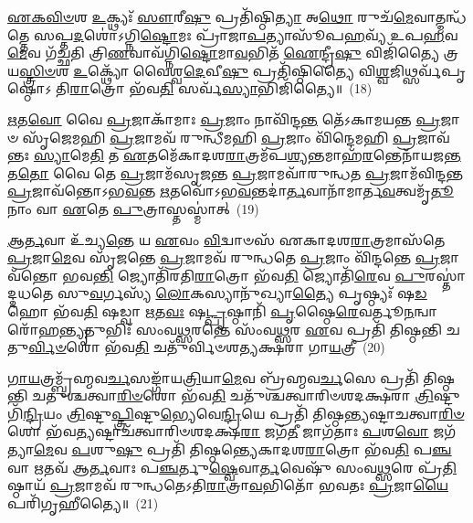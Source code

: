 \-\ul{𑌏}\-\-\ul{𑌕}\-\-\ul{𑌵𑌿}\-\-\ul{𑍞}\-𑌶 \ul{𑌉}\-𑌕𑍍𑌥𑍍𑌯𑌃᳴ \ul{𑌸𑍗}\-𑌰𑍀\-\ul{𑌷𑍁} 𑌪𑍍𑌰𑌤𑌿᳴𑌷𑍍𑌠𑌿\-\ul{𑌤𑍍𑌯𑌾} 𑌅\-\ul{𑌥𑍋} 𑌰𑍁𑌚᳴\-\ul{𑌮𑍇}\-𑌵𑌾𑌤𑍍𑌮𑌨𑍍𑌧᳴𑌤𑍍𑌤𑍇 𑌸𑌪𑍍𑌤\-\ul{𑌦}\-𑌶𑍋॑\-𑌽𑌗𑍍𑌨𑌿\-\ul{𑌷𑍍𑌟𑍋}\-𑌮𑌃 𑌪𑍍𑌰𑌾᳴𑌜𑌾\-\ul{𑌪}\-𑌤𑍍𑌯𑌾𑌸𑍂᳴𑌪\-\ul{𑌹}\-𑌵𑍍𑌯᳴ 𑌉𑌪\-\ul{𑌹}\-𑌵\-\ul{𑌮𑍇}\-𑌵 𑌗᳴𑌚𑍍𑌛𑌤𑌿 𑌤𑍍𑌰𑌿\-\ul{𑌣}\-𑌵𑌾𑌵᳴𑌗𑍍𑌨𑌿\-\ul{𑌷𑍍𑌟𑍋}\-𑌮𑌾\-\ul{𑌵}\-𑌭𑌿𑌤᳴ \ul{𑌐}\-𑌨𑍍𑌦𑍍𑌰𑍀\-\ul{𑌷𑍁} 𑌵𑌿𑌜𑌿᳴𑌤𑍍𑌯𑍈 𑌤𑍍𑌰𑌯\-\ul{𑌸𑍍𑌤𑍍𑌰𑌿}\-\-\ul{𑍞}\-𑌶 \ul{𑌉}\-𑌕𑍍𑌥𑍍𑌯𑍋᳴ 𑌵𑍈𑌶𑍍𑌵\-\ul{𑌦𑍇}\-𑌵𑍀\-\ul{𑌷𑍁} 𑌪𑍍𑌰𑌤𑌿᳴𑌷𑍍𑌠𑌿𑌤𑍍𑌯𑍈 𑌵𑌿\-\ul{𑌶𑍍𑌵}\-𑌜𑌿𑌥𑍍𑌸𑌰𑍍𑌵᳴𑌪𑍃𑌷𑍍𑌠𑍋\-𑌽 𑌤𑌿\-\ul{𑌰𑌾}\-𑌤𑍍𑌰𑍋 𑌭᳴𑌵\-\ul{𑌤𑌿} 𑌸𑌰𑍍𑌵᳴\-\ul{𑌸𑍍𑌯𑌾}\-𑌭𑌿𑌜𑌿᳴𑌤𑍍𑌯𑍈॥~(18)

{\anuvakamend[{\-\ul{𑌪𑍍𑌰𑌾}\-\-\ul{𑌜𑌾}\-\-\ul{𑌪}\-𑌤𑍍𑌯𑍋 𑌵𑌾 \ul{𑌏}\-𑌷 \ul{𑌯}\-𑌜𑍍𑌞𑍋 𑌯𑌦𑍍𑌦᳴𑌶\-\ul{𑌰𑌾}\-𑌤𑍍𑌰𑌸𑍍𑌤𑍍𑌰𑌿᳴\-\ul{𑌕}\-𑌕𑍁𑌦𑍍𑌵𑌾 \ul{𑌏}\-𑌤𑌾 𑌵𑍈 𑌜𑌾᳴𑌯\-\ul{𑌤} 𑌏𑌕᳴𑌤𑍍𑌰𑌿𑍞𑌶𑌚𑍍𑌚}]}%

\-\ul{𑌋}\-𑌤\-\ul{𑌵𑍋} 𑌵𑍈 \ul{𑌪𑍍𑌰}\-𑌜𑌾𑌕𑌾᳴𑌮𑌾𑌃 \ul{𑌪𑍍𑌰}\-𑌜𑌾𑌂 𑌨𑌾𑌵𑌿᳴𑌨𑍍𑌦\-\ul{𑌨𑍍𑌤} 𑌤𑍇᳴\-𑌽𑌕𑌾𑌮𑌯𑌨𑍍𑌤 \ul{𑌪𑍍𑌰}\-𑌜𑌾𑍞 𑌸𑍃᳴𑌜𑍇𑌮𑌹𑌿 \ul{𑌪𑍍𑌰}\-𑌜𑌾𑌮𑌵᳴ 𑌰𑍁𑌨𑍍𑌧𑍀𑌮𑌹𑌿 \ul{𑌪𑍍𑌰}\-𑌜𑌾𑌂 𑌵𑌿᳴𑌨𑍍𑌦𑍇𑌮𑌹𑌿 \ul{𑌪𑍍𑌰}\-𑌜𑌾𑌵᳴𑌨𑍍𑌤𑌃 \ul{𑌸𑍍𑌯𑌾}\-𑌮𑍇\-\ul{𑌤𑌿} 𑌤 \ul{𑌏}\-𑌤𑌮𑍇᳴𑌕𑌾𑌦𑌶\-\ul{𑌰𑌾}\-𑌤𑍍𑌰𑌮᳴𑌪\-\ul{𑌶𑍍𑌯}\-𑌨𑍍𑌤𑌮𑌾𑌹᳴\-\ul{𑌰}\-𑌨𑍍𑌤𑍇𑌨𑌾᳴𑌯𑌜\-\ul{𑌨𑍍𑌤} 𑌤\-\ul{𑌤𑍋} 𑌵𑍈 𑌤𑍇 \ul{𑌪𑍍𑌰}\-𑌜𑌾𑌮᳴𑌸𑍃𑌜𑌨𑍍𑌤 \ul{𑌪𑍍𑌰}\-𑌜𑌾𑌮𑌵𑌾᳴𑌰𑍁𑌨𑍍𑌧𑌤 \ul{𑌪𑍍𑌰}\-𑌜𑌾𑌮᳴𑌵𑌿𑌨𑍍𑌦𑌨𑍍𑌤 \ul{𑌪𑍍𑌰}\-𑌜𑌾𑌵᳴𑌨𑍍𑌤𑍋\-𑌽𑌭\-\ul{𑌵}\-𑌨𑍍𑌤 \ul{𑌋}\-𑌤𑌵𑍋᳴\-𑌽𑌭\-\ul{𑌵}\-𑌨𑍍𑌤𑌦𑌾॑\-\ul{𑌰𑍍𑌤}\-𑌵𑌾𑌨𑌾᳴𑌮𑌾𑌰𑍍𑌤\-\ul{𑌵}\-𑌤𑍍𑌵𑌮𑍃᳴\-\ul{𑌤𑍂}\-𑌨𑌾𑌂 𑌵𑌾 \ul{𑌏}\-𑌤𑍇 \ul{𑌪𑍁}\-𑌤𑍍𑌰𑌾𑌸𑍍𑌤𑌸𑍍𑌮𑌾॑𑌤𑍍~(19)

\-\ul{𑌆}\-\-\ul{𑌰𑍍𑌤}\-𑌵𑌾 𑌉᳴𑌚𑍍𑌯\-\ul{𑌨𑍍𑌤𑍇} 𑌯 \ul{𑌏}\-𑌵𑌂 \ul{𑌵𑌿}\-𑌦𑍍𑌵𑌾𑍞𑌸᳴ 𑌏𑌕𑌾𑌦𑌶\-\ul{𑌰𑌾}\-𑌤𑍍𑌰𑌮𑌾𑌸᳴𑌤𑍇 \ul{𑌪𑍍𑌰}\-𑌜𑌾\-\ul{𑌮𑍇}\-𑌵 𑌸𑍃᳴𑌜𑌨𑍍𑌤𑍇 \ul{𑌪𑍍𑌰}\-𑌜𑌾𑌮𑌵᳴ 𑌰𑍁𑌨𑍍𑌧𑌤𑍇 \ul{𑌪𑍍𑌰}\-𑌜𑌾𑌂 𑌵𑌿᳴𑌨𑍍𑌦𑌨𑍍𑌤𑍇 \ul{𑌪𑍍𑌰}\-𑌜𑌾𑌵᳴𑌨𑍍𑌤𑍋 𑌭𑌵\-\ul{𑌨𑍍𑌤𑌿} 𑌜𑍍𑌯𑍋𑌤𑌿᳴𑌰𑌤𑌿\-\ul{𑌰𑌾}\-𑌤𑍍𑌰𑍋 𑌭᳴𑌵\-\ul{𑌤𑌿} 𑌜𑍍𑌯𑍋𑌤𑌿᳴\-\ul{𑌰𑍇}\-𑌵 \ul{𑌪𑍁}\-𑌰𑌸𑍍𑌤𑌾॑𑌦𑍍𑌦𑌧𑌤𑍇 𑌸𑍁\-\ul{𑌵}\-𑌰𑍍𑌗𑌸𑍍𑌯᳴ \ul{𑌲𑍋}\-𑌕𑌸𑍍𑌯𑌾𑌨𑍁᳴𑌖𑍍𑌯𑌾\-\ul{𑌤𑍍𑌯𑍈} 𑌪𑍃𑌷𑍍𑌠𑍍𑌯𑌃᳴ 𑌷\-\ul{𑌡}\-𑌹𑍋 𑌭᳴𑌵\-\ul{𑌤𑌿} 𑌷𑌡𑍍𑌵𑌾 \ul{𑌋}\-𑌤\-\ul{𑌵𑌃} 𑌷\-\ul{𑌟𑍍𑌪𑍃}\-𑌷𑍍𑌠𑌾𑌨𑌿᳴ \ul{𑌪𑍃}\-𑌷𑍍𑌠𑍈\-\ul{𑌰𑍇}\-𑌵𑌰𑍍𑌤𑍂\-\ul{𑌨}\-𑌨𑍍𑌵𑌾𑌰𑍋᳴𑌹\-\ul{𑌨𑍍𑌤𑍍𑌯𑍃}\-𑌤𑍁𑌭𑌿𑌃᳴ 𑌸𑌂𑌵\-\ul{𑌥𑍍𑌸}\-𑌰𑌨𑍍𑌤𑍇 𑌸𑌂᳴𑌵\-\ul{𑌥𑍍𑌸}\-𑌰 \ul{𑌏}\-𑌵 𑌪𑍍𑌰𑌤𑌿᳴ 𑌤𑌿𑌷𑍍𑌠𑌨𑍍𑌤𑌿 𑌚𑌤𑍁\-\ul{𑌰𑍍𑌵𑌿}\-\-\ul{𑍞}\-𑌶𑍋 𑌭᳴𑌵\-\ul{𑌤𑌿} 𑌚𑌤𑍁᳴𑌰𑍍𑌵𑌿𑍞𑌶𑌤𑍍𑌯𑌕𑍍𑌷𑌰𑌾 𑌗𑌾\-\ul{𑌯}\-𑌤𑍍𑌰𑍀~(20)

\-\ul{𑌗𑌾}\-\-\ul{𑌯}\-𑌤𑍍𑌰𑌮𑍍𑌬𑍍𑌰᳴𑌹𑍍𑌮𑌵\-\ul{𑌰𑍍𑌚}\-𑌸𑌙𑍍𑌗𑌾᳴𑌯\-\ul{𑌤𑍍𑌰𑌿}\-𑌯𑌾\-\ul{𑌮𑍇}\-𑌵 𑌬𑍍𑌰᳴𑌹𑍍𑌮𑌵\-\ul{𑌰𑍍𑌚}\-𑌸𑍇 𑌪𑍍𑌰𑌤𑌿᳴ 𑌤𑌿𑌷𑍍𑌠𑌨𑍍𑌤𑌿 𑌚𑌤𑍁𑌶𑍍𑌚𑌤𑍍𑌵𑌾\-\ul{𑌰𑌿}\-\-\ul{𑍞}\-𑌶𑍋 𑌭᳴𑌵\-\ul{𑌤𑌿} 𑌚𑌤𑍁᳴𑌶𑍍𑌚𑌤𑍍𑌵𑌾𑌰𑌿𑍞𑌶𑌦𑌕𑍍𑌷𑌰𑌾 \ul{𑌤𑍍𑌰𑌿}\-𑌷𑍍𑌟𑍁𑌗𑌿᳴\-\ul{𑌨𑍍𑌦𑍍𑌰𑌿}\-𑌯𑌂 \ul{𑌤𑍍𑌰𑌿}\-𑌷𑍍𑌟𑍁\-\ul{𑌪𑍍𑌤𑍍𑌰𑌿}\-𑌷𑍍𑌟𑍁\-\ul{𑌭𑍍𑌯𑍇}\-𑌵𑍇\-\ul{𑌨𑍍𑌦𑍍𑌰𑌿}\-𑌯𑍇 𑌪𑍍𑌰𑌤𑌿᳴ 𑌤𑌿𑌷𑍍𑌠𑌨𑍍𑌤𑍍𑌯𑌷𑍍𑌟𑌾𑌚𑌤𑍍𑌵𑌾\-\ul{𑌰𑌿}\-\-\ul{𑍞}\-𑌶𑍋 𑌭᳴𑌵\-\ul{𑌤𑍍𑌯}\-𑌷𑍍𑌟𑌾𑌚᳴𑌤𑍍𑌵𑌾𑌰𑌿𑍞𑌶𑌦𑌕𑍍𑌷\-\ul{𑌰𑌾} 𑌜𑌗᳴\-\ul{𑌤𑍀} 𑌜𑌾𑌗᳴𑌤𑌾𑌃 \ul{𑌪}\-𑌶\-\ul{𑌵𑍋} 𑌜𑌗᳴𑌤𑍍𑌯𑌾\-\ul{𑌮𑍇}\-𑌵 \ul{𑌪}\-𑌶𑍁\-\ul{𑌷𑍁} 𑌪𑍍𑌰𑌤𑌿᳴ 𑌤𑌿𑌷𑍍𑌠𑌨𑍍𑌤𑍍𑌯𑍇𑌕𑌾𑌦𑌶\-\ul{𑌰𑌾}\-𑌤𑍍𑌰𑍋 𑌭᳴𑌵\-\ul{𑌤𑌿} 𑌪\-\ul{𑌞𑍍𑌚} 𑌵𑌾 \ul{𑌋}\-𑌤𑌵᳴ 𑌆\-\ul{𑌰𑍍𑌤}\-𑌵𑌾𑌃 𑌪\-\ul{𑌞𑍍𑌚}\-𑌰𑍍𑌤𑍁\-\ul{𑌷𑍍𑌵𑍇}\-𑌵𑌾\-\ul{𑌰𑍍𑌤}\-𑌵𑍇𑌷𑍁᳴ 𑌸𑌂𑌵\-\ul{𑌥𑍍𑌸}\-𑌰𑍇 𑌪𑍍𑌰᳴\-\ul{𑌤𑌿}\-𑌷𑍍𑌠𑌾𑌯᳴ \ul{𑌪𑍍𑌰}\-𑌜𑌾𑌮𑌵᳴ 𑌰𑍁𑌨𑍍𑌧𑌤𑍇\-𑌽𑌤𑌿\-\ul{𑌰𑌾}\-𑌤𑍍𑌰𑌾\-\ul{𑌵}\-𑌭𑌿𑌤𑍋᳴ 𑌭𑌵𑌤𑌃 \ul{𑌪𑍍𑌰}\-𑌜𑌾\-\ul{𑌯𑍈} 𑌪𑌰𑌿᳴𑌗𑍃𑌹𑍀𑌤𑍍𑌯𑍈॥~(21)

